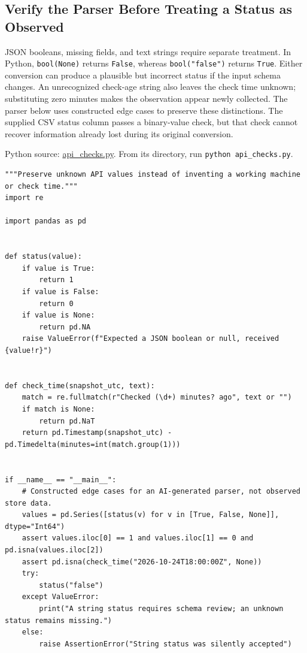 \hypertarget{M02-verify-the-parser-before-treating-a-status-as-observed}{%
\subsection{Verify the Parser Before Treating a Status as
Observed}\label{M02-verify-the-parser-before-treating-a-status-as-observed}}

\noindent \noindent JSON booleans, missing fields, and text strings require
separate treatment. In Python, \texttt{bool(None)} returns
\texttt{False}, whereas \texttt{bool("false")} returns \texttt{True}.
Either conversion can produce a plausible but incorrect status if the
input schema changes. An unrecognized check-age string also leaves the
check time unknown; substituting zero minutes makes the observation
appear newly collected. The parser below uses constructed edge cases to
preserve these distinctions. The supplied CSV status column passes a
binary-value check, but that check cannot recover information already
lost during its original conversion.

\FloatBarrier
{}
Python source:
\href{../03_Data_and_Code/McBroken/api_checks.py}{api\_checks.py}. From
its directory, run \texttt{python\ api\_checks.py}.

\begin{Verbatim}[breaklines,breakanywhere,fontsize=\small]
"""Preserve unknown API values instead of inventing a working machine or check time."""
import re

import pandas as pd


def status(value):
    if value is True:
        return 1
    if value is False:
        return 0
    if value is None:
        return pd.NA
    raise ValueError(f"Expected a JSON boolean or null, received {value!r}")


def check_time(snapshot_utc, text):
    match = re.fullmatch(r"Checked (\d+) minutes? ago", text or "")
    if match is None:
        return pd.NaT
    return pd.Timestamp(snapshot_utc) - pd.Timedelta(minutes=int(match.group(1)))


if __name__ == "__main__":
    # Constructed edge cases for an AI-generated parser, not observed store data.
    values = pd.Series([status(v) for v in [True, False, None]], dtype="Int64")
    assert values.iloc[0] == 1 and values.iloc[1] == 0 and pd.isna(values.iloc[2])
    assert pd.isna(check_time("2026-10-24T18:00:00Z", None))
    try:
        status("false")
    except ValueError:
        print("A string status requires schema review; an unknown status remains missing.")
    else:
        raise AssertionError("String status was silently accepted")
\end{Verbatim}

